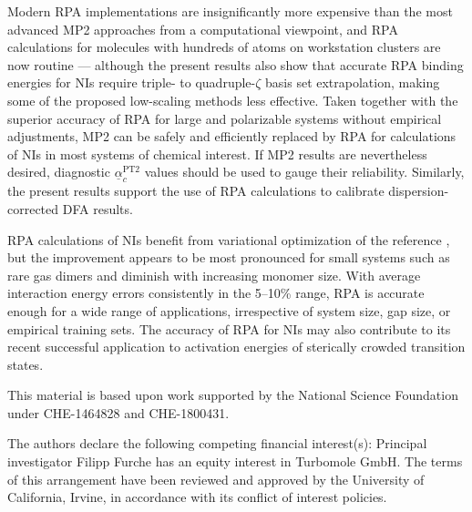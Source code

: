 \documentclass[journal=jctcce,manuscript=article]{achemso}
\begin{document}
Modern RPA implementations are insignificantly more expensive than the
most advanced MP2 approaches from a computational viewpoint, and RPA
calculations for molecules with 
hundreds of atoms on workstation clusters are now routine
\cite{Eshuis10JChemPhys132p234114,Hesselmann12PhysRevA85p012517,Riplinger13JChemPhys,   
  Kallay15JChemPhys142p204105,Chen17AnnuRevPhysChem68p421,Schurkus16JChemPhys144p031101,
  doi:10.1021/acs.jctc.6b01235,doi:10.1063/1.5052572,doi:10.1021/acs.jctc.9b00444}
--- although the present results also show that accurate RPA binding
energies for NIs require triple- to quadruple-$\zeta$ basis set
extrapolation, making some of the proposed low-scaling methods less 
effective. 
Taken together with the superior accuracy of RPA for large and polarizable
systems without empirical adjustments, MP2 can be safely and efficiently
replaced by RPA for calculations of NIs in most systems of chemical
interest. If MP2 results are nevertheless desired,
diagnostic $\underline{\alpha}_{c}^{\text{PT2}}$ values should be
used to gauge their reliability. Similarly, the present results support
the use of RPA calculations to calibrate dispersion-corrected DFA results.

RPA calculations of NIs benefit from variational
optimization of the reference \cite{PhysRevA.99.012518}, but the
improvement appears to be most pronounced for small systems such as rare
gas dimers and diminish with increasing monomer size. With average interaction
energy errors consistently in the 5--10\% range, RPA is accurate enough for
a wide range of applications, irrespective of system size, gap size, or empirical
training sets. The accuracy of RPA for NIs may also contribute to its
recent successful application to activation energies of sterically
crowded transition
states.\cite{Tao16ChemEurJ22p8786,doi:10.1021/acs.joc.9b01319} 

\begin{acknowledgement}

This material is based upon work supported by
the National Science Foundation under CHE-1464828 and CHE-1800431.

The authors declare the following competing financial interest(s):
Principal investigator Filipp Furche has an equity interest in Turbomole
GmbH. The terms of this arrangement have been reviewed and approved by
the University of California, Irvine, in accordance with its conflict of
interest policies.

\end{acknowledgement}
\end{document}
